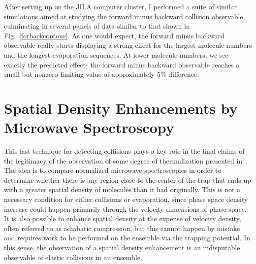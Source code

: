 After setting up on the JILA computer cluster, I performed a suite of similar simulations aimed at studying the forward minus backward collision observable, culminating in several panels of data similar to that shown in Fig.~\ref{forbackcontour}.
As one would expect, the forward minus backward observable really starts displaying a strong effect for the largest molecule numbers and the longest evaporation sequences.
At lower molecule numbers, we see exactly the predicted effect- the forward minus backward observable reaches a small but nonzero limiting value of approximately $5\%$ difference.

\section{Spatial Density Enhancements by Microwave Spectroscopy}

This last technique for detecting collisions plays a key role in the final claims of the legitimacy of the observation of some degree of thermalization presented in~\citep[App.~B]{Reens2017}.
The idea is to compare normalized microwave spectroscopies in order to determine whether there is any region close to the center of the trap that ends up with a greater spatial density of molecules than it had originally.
This is not a necessary condition for either collisions or evaporation, since phase space density increase could happen primarily through the velocity dimensions of phase space.
It is also possible to enhance spatial density at the expense of velocity density, often referred to as adiabatic compression, but this cannot happen by mistake and requires work to be performed on the ensemble via the trapping potential.
In this sense, the observation of a spatial density enhancement is an indisputable observable of elastic collisions in an ensemble.

